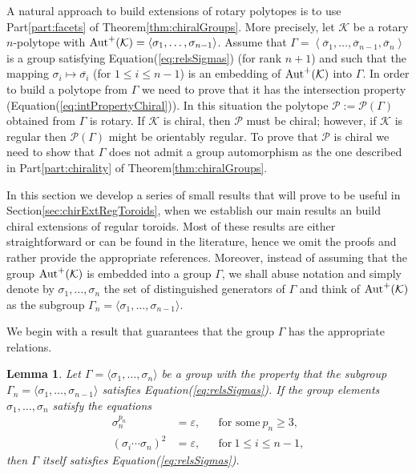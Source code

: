 \documentclass[final]{amsart}
\theoremstyle{plain}
\newtheorem{lem}[thm]{Lemma}
\theoremstyle{definition}
\theoremstyle{remark}
\numberwithin{equation}{section}
\renewcommand{\leq}{\leqslant} \renewcommand{\geq}{\geqslant}
\renewcommand{\{}{\lbrace}
\renewcommand{\}}{\rbrace}
\renewcommand{\bar}{\overline}
\newcommand{\cK}{\mathcal{K}}
\newcommand{\cP}{\mathcal{P}}
\newcommand{\id}{\varepsilon}
\begin{document}
A natural approach to build extensions of rotary polytopes is to use Part\nobreakspace \ref {part:facets} of Theorem\nobreakspace \ref {thm:chiralGroups}.
More precisely, let $\cK$ be a rotary $n$-polytope with $\autp(\cK)=\left\langle \sigma_{1}, \dots, \sigma_{n-1} \right\rangle $.
Assume that $\Gamma = \left\langle \bar{\sigma}_{1}, \dots, \bar{\sigma}_{n-1}, \bar{\sigma}_{n} \right\rangle $ is a group satisfying Equation\nobreakspace \textup {(\ref {eq:relsSigmas})} (for rank $n+1$) and such that the mapping $\sigma_{i} \mapsto \bar{\sigma_{i}}$ (for $1 \leq i \leq n-1 $) is an embedding of $\autp(\cK)$ into $\Gamma$.
In order to build a polytope from $\Gamma$ we need to prove that it has the intersection property (Equation\nobreakspace \textup {(\ref {eq:intPropertyChiral})}). 
In this situation the polytope $\cP:=\cP(\Gamma)$ obtained from $\Gamma$ is rotary.
If $\cK$ is chiral, then $\cP$ must be chiral; 
however, if $\cK$ is regular then $\cP(\Gamma)$ might be orientably regular.
To prove that $\cP$ is chiral we need to show that $\Gamma$ does not admit a group automorphism as the one described in Part\nobreakspace \ref {part:chirality} of Theorem\nobreakspace \ref {thm:chiralGroups}.

In this section we develop a series of small results that will prove to be useful in Section\nobreakspace \ref {sec:chirExtRegToroids}, when we establish our main results an build chiral extensions of regular toroids. 
Most of these results are either straightforward or can be found in the literature, hence we omit the proofs and rather provide the appropriate references.
Moreover, instead of assuming that the group $\autp(\cK)$ is embedded into a group $\Gamma$, we shall abuse notation and simply denote by $\sigma_1, \dots, \sigma_n$ the set of distinguished generators of $\Gamma$ and think of $\autp(\cK)$ as the subgroup $ \Gamma_{n}= \langle \sigma_1, \dots, \sigma_{n-1} \rangle$.

We begin with a result that guarantees that the group $\Gamma$ has the appropriate relations.

\begin{lem}\label{lem:relsOfExtensions}
  Let $\Gamma = \langle \sigma_{1}, \dots, \sigma_{n} \rangle$ be a group with the property that the subgroup $\Gamma_{n} = \langle \sigma_{1}, \dots, \sigma_{n-1} \rangle$ satisfies Equation\nobreakspace \textup {(\ref {eq:relsSigmas})}. If the group elements $\sigma_{1}, \dots, \sigma_{n}$ satisfy the equations
\begin{equation}\label{eq:secondSetOfRels}
    \begin{aligned}
      \sigma_{n}^{p_{n}} &= \id, && \text{for some}\ p_{n} \geq 3,\\
      (\sigma_{i} \cdots \sigma_{n})^{2} &= \id, && \text{for}\ 1\leq i \leq n-1,
    \end{aligned}
  \end{equation}
  then $\Gamma$ itself satisfies Equation\nobreakspace \textup {(\ref {eq:relsSigmas})}.
\end{lem}
\end{document}
